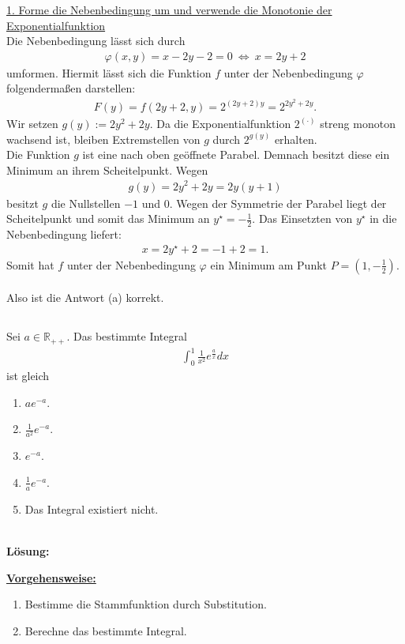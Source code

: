 \underline{1. Forme die Nebenbedingung um und verwende die Monotonie der Exponentialfunktion}\\
Die Nebenbedingung lässt sich durch
\begin{align*}
	\varphi(x,y) = x - 2y -2 = 0
	\ \Leftrightarrow \
	x = 2 y  +2 
\end{align*}
umformen. Hiermit lässt sich die Funktion $ f $ unter der Nebenbedingung $ \varphi $ folgendermaßen darstellen:
\begin{align*}
	F(y) = f(2y+2,y) = 2^{(2y +2) y }
	=2^{2y^2 + 2y}.
\end{align*}
Wir setzen $ g(y) := 2y^2 +2y $. Da die Exponentialfunktion $ 2^{(\cdot)} $ streng monoton wachsend ist, bleiben Extremstellen von $ g $ durch $ 2^{g(y)} $ erhalten.\\
Die Funktion $ g $ ist eine nach oben geöffnete Parabel. Demnach besitzt diese ein Minimum an ihrem Scheitelpunkt.
Wegen 
\begin{align*}
	g(y) = 2 y^2 +2 y
	= 2 y (y +1)
\end{align*}
besitzt $ g $ die Nullstellen $ -1 $ und $ 0 $. Wegen der Symmetrie der Parabel liegt der Scheitelpunkt und somit das Minimum an $ y^\star = -\frac{1}{2} $. Das Einsetzten von $ y^\star $ in die Nebenbedingung liefert:
\begin{align*}
	x = 2 y^\star + 2 = -1 + 2 = 1.
\end{align*}
Somit hat $ f $ unter der Nebenbedingung $ \varphi $ ein Minimum am Punkt $ P = \left(1, -\frac{1}{2}\right) $.\\
\\
Also ist die Antwort (a) korrekt.


 
\newpage

\subsection*{}
Sei $ a \in \mathbb{R}_{++} $. Das bestimmte Integral
\begin{align*}
	\int_0^1
	\frac{1}{x^2} e^{\frac{a}{x}} dx
\end{align*}
ist gleich
\renewcommand{\labelenumi}{(\alph{enumi})}
\begin{enumerate}
	\item 
	$a e^{-a} $.
	\item
	$\frac{1}{a^2} e^{-a}$.
	\item
	$e^{-a} $.
	\item
	$\frac{1}{a} e^{-a}$.	
	\item
	Das Integral existiert nicht.
\end{enumerate}
\ \\
\textbf{Lösung:}
\begin{mdframed}
\underline{\textbf{Vorgehensweise:}}
\renewcommand{\labelenumi}{\theenumi.}
\begin{enumerate}
\item Bestimme die Stammfunktion durch Substitution.
\item Berechne das bestimmte Integral.
\end{enumerate}
\end{mdframed}


